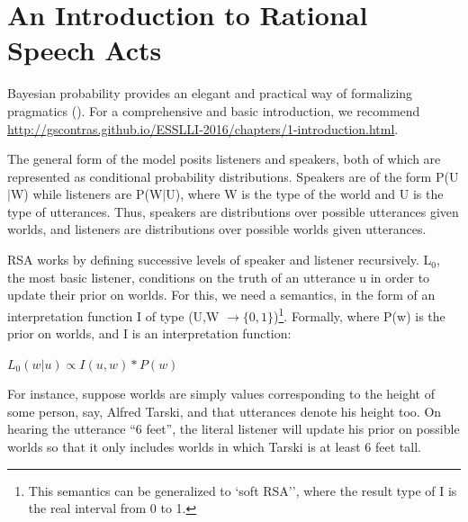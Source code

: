\documentclass[10pt,letterpaper,twocolumn]{article}
\begin{document}




\section{An Introduction to Rational Speech Acts} \label{rsa}

Bayesian probability provides an elegant and practical way of formalizing pragmatics (\cite{frank2012predicting}). For a comprehensive and basic introduction, we recommend \url{http://gscontras.github.io/ESSLLI-2016/chapters/1-introduction.html}.

The general form of the model posits listeners and speakers, both of which are represented as conditional probability distributions. Speakers are of the form P(U$\vert$W) while listeners are P(W$\vert$U), where W is the type of the world and U is the type of utterances. Thus, speakers are distributions over possible utterances given worlds, and listeners are distributions over possible worlds given utterances.

RSA works by defining successive levels of speaker and listener recursively. L$_0$, the most basic listener, conditions on the truth of an utterance u in order to update their prior on worlds. For this, we need a semantics, in the form of an interpretation function I of type (U,W $\to \{0,1\}$)\footnote{This semantics can be generalized to `soft RSA'', where the result type of I is the real interval from 0 to 1.}. Formally, where P(w) is the prior on worlds, and I is an interpretation function:
\begin{exe}
\ex  $L_0(w\vert u) \propto  I(u,w)*P(w)$ \label{l0def}
\end{exe}

For instance, suppose worlds are simply values corresponding to the height of some person, say, Alfred Tarski, and that utterances denote his height too. On hearing the utterance ``6 feet'', the literal listener will update his prior on possible worlds so that it only includes worlds in which Tarski is at least 6 feet tall.
\end{document}
